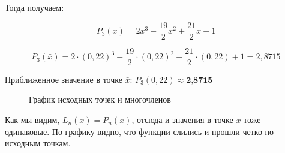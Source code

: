 \documentclass[a4paper,12pt]{article} %
\begin{document}
\begin{enumerate}
Тогда получаем:

$$P_3(x) = 2x^3 - \frac{19}{2}x^2 + \frac{21}{2}x + 1$$

$$
P_3(\bar x) = 2 \cdot (0,22)^3 - \frac{19}{2} \cdot (0,22)^2 + \frac{21}{2} \cdot (0,22) + 1 = 2,8715
$$

Приближенное значение в точке $\bar x$: $P_3(0,22) \approx \textbf{2,8715}$

\begin{figure}[h]
\caption{График исходных точек и многочленов}
\label{fig:image}
\end{figure}

\end{enumerate}

Как мы видим, $L_n(x) = P_n(x)$, отсюда и значения в точке $\bar x$ тоже одинаковые. По графику видно, что функции слились и прошли четко по исходным точкам. 
\end{document}
